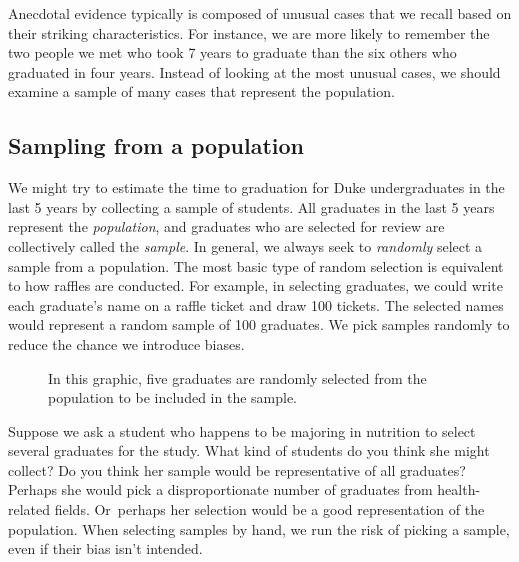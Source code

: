 Anecdotal evidence typically is composed of unusual cases that we recall based on their striking characteristics. For instance, we are more likely to remember the two people we met who took 7 years to graduate than the six others who graduated in four years. Instead of looking at the most unusual cases, we should examine a sample of many cases that represent the population.

\subsection{Sampling from a population}


We might try to estimate the time to graduation for Duke
undergraduates in the last 5 years by collecting a sample
of students.
All graduates in the last 5 years represent the
\emph{population}, and graduates who are
selected for review are collectively called the
\emph{sample}.
In general, we always seek to \emph{randomly} select a sample
from a population.
The most basic type of random selection is equivalent to how
raffles are conducted.
For example, in selecting graduates, we could write each
graduate's name on a raffle ticket and draw 100 tickets.
The selected names would represent a random sample of 100 graduates.
We pick samples randomly to reduce the chance we introduce biases.

\begin{figure}[ht]
  \centering
  \caption{In this graphic, five graduates are randomly
      selected from the population to be included in the
      sample.}
  \label{popToSampleGraduates}
\end{figure}

\begin{examplewrap}
\begin{nexample}{Suppose we ask a student who happens to be
    majoring in nutrition to select several graduates for
    the study.
    What kind of students do you think she might collect?
    Do you think her sample would be representative of all
    graduates?}
  Perhaps she would pick a disproportionate number of graduates
  from health-related fields.
  Or~perhaps her selection would be a good representation
  of the population.
  When selecting samples by hand, we run the risk of picking
  a  sample, even if their bias
  isn't intended.
\end{nexample}
\end{examplewrap}

